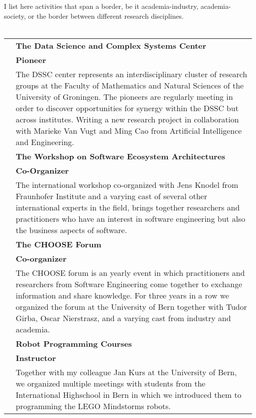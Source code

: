 


I list here activities that span a border, be it academia-industry, academia-society, or the border between different research disciplines.
\\ \\ 

\newcommand {\outreach}[4]{
	\makebox[2.5cm][r]{\small #1} &
	{\bf #2} \\ & 
	{\bf #3} \\ & 
	#4 \vspace{0.7em}\\
}


\begin{tabular}{rp{10.5cm}}

	\outreach 
		{2015 -- ...}
		{The Data Science and Complex Systems Center}{Pioneer}
			{The DSSC center represents an interdisciplinary cluster of research groups at the Faculty of Mathematics and Natural Sciences of the University of Groningen. The pioneers are regularly meeting in order to discover opportunities for synergy within the DSSC but across institutes. Writing a new research project in collaboration with Marieke Van Vugt and Ming Cao from Artificial Intelligence and Engineering.}

	\outreach 
		{2013, 2014, 2015}
		{The Workshop on Software Ecosystem Architectures}{Co-Organizer}
			{The international workshop co-organized with Jens Knodel from Fraunhofer Institute and a varying cast of several other international experts in the field, brings together researchers and practitioners who have an interest in software engineering but also the business aspects of software. }


	\outreach 
		{2012, 2013, 2014}
			{The CHOOSE Forum}{Co-organizer}
			{The CHOOSE forum is an yearly event in which practitioners and researchers from Software Engineering come together to  exchange information and share knowledge. For three years in a row we organized the forum at the University of Bern together with Tudor Girba, Oscar Nierstrasz, and a varying cast from industry and academia.}

	\outreach
		{2013 -- 2014}
			{Robot Programming Courses}{Instructor}
			{Together with my colleague Jan Kurs at the University of Bern, we organized multiple meetings with students from the International Highschool in Bern in which we introduced them to programming the LEGO Mindstorms robots. }


\end{tabular}
